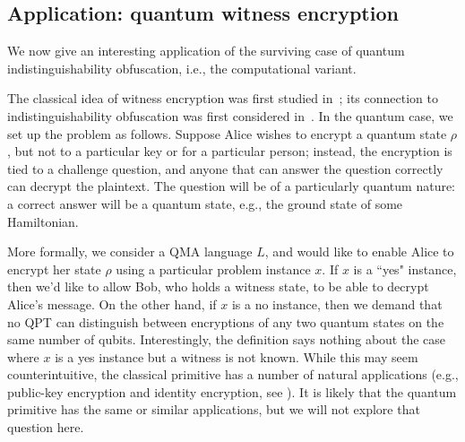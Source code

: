 \documentclass[envcountsame]{llncs}
\numberwithin{equation}{section}
\begin{document}
\subsection{Application: quantum witness encryption}

We now give an interesting application of the surviving case of quantum indistinguishability obfuscation, i.e., the computational variant.

The classical idea of witness encryption was first studied in~\cite{GGSW13}; its connection to indistinguishability obfuscation was first considered in~\cite{GGHRSW13}. In the quantum case, we set up the problem as follows. Suppose Alice wishes to encrypt a quantum state $\rho$, but not to a particular key or for a particular person; instead, the encryption is tied to a challenge question, and anyone that can answer the question correctly can decrypt the plaintext. The question will be of a particularly quantum nature: a correct answer will be a quantum state, e.g., the ground state of some Hamiltonian.

More formally, we consider a QMA language $L$, %
and would like to enable Alice to encrypt her state $\rho$ using a particular problem instance $x$. %
If $x$ is a ``yes" instance, %
then we'd like to allow Bob, who holds a witness state, to be able to decrypt Alice's message.  On the other hand, if $x$ is a no instance, then we demand that no QPT can distinguish between encryptions of any two quantum states  on the same number of qubits.  Interestingly, the definition says nothing about the case where $x$ is a yes instance but a witness is not known. While this may seem counterintuitive, the classical primitive has a number of natural applications (e.g., public-key encryption and identity encryption, see \cite{GGSW13}). It is likely that the quantum primitive has the same or similar applications, but we will not explore that question here.
\end{document}
